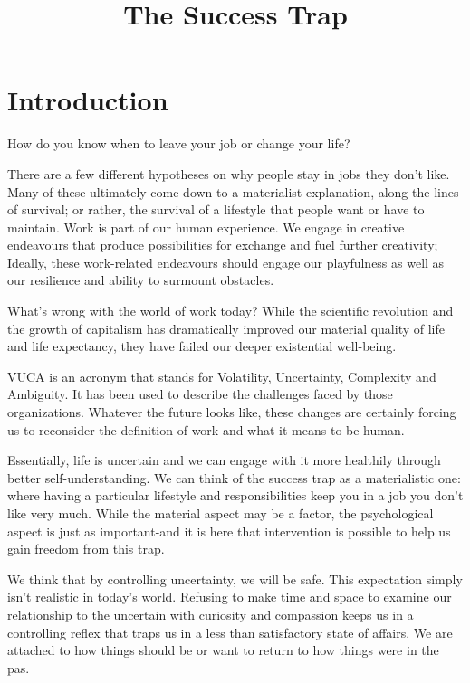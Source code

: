 \documentclass[ebook,12pt,oneside,openany]{memoir}
\begin{document}
\title{The Success Trap}
\maketitle
\section{Introduction}
How do you know when to leave your job or change your life?

There are a few different hypotheses on why people stay in jobs they don't like. Many of these ultimately come down to a materialist explanation, 
along the lines of survival; or rather, the survival of a lifestyle that people want or have to maintain.
Work is part of our human experience. We engage in creative endeavours that produce possibilities for exchange and fuel further creativity;
Ideally, these work-related endeavours should engage our playfulness as well as our resilience and ability to surmount obstacles.

What's wrong with the world of work today? While the scientific revolution and the growth of capitalism has dramatically improved our material quality of life and life expectancy, 
they have failed our deeper existential well-being.

VUCA is an acronym that stands for Volatility, Uncertainty, Complexity and Ambiguity.
It has been used to describe the challenges faced by those organizations.
Whatever the future looks like, these changes are certainly forcing us to reconsider the definition of work and what it means to be human.

Essentially, life is uncertain and we can engage with it more healthily through better self-understanding.
We can think of the success trap as a materialistic one: where having a particular lifestyle and responsibilities keep you in a job you don't like very much.
While the material aspect may be a factor, the psychological aspect is just as important-and it is here that intervention is possible to help us gain freedom from this trap.

We think that by controlling uncertainty, we will be safe. This expectation simply isn't realistic in today's world.
Refusing to make time and space to examine our relationship to the uncertain with curiosity and compassion keeps us in a controlling reflex that traps us in a less than satisfactory state of affairs.
We are attached to how things should be or want to return to how things were in the pas.
\end{document}
